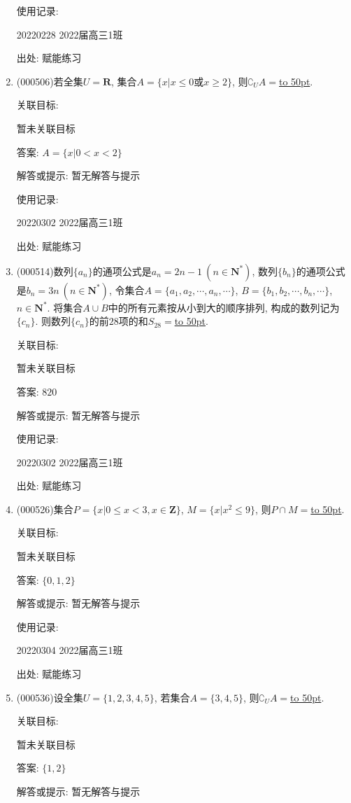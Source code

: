 \documentclass[10pt,a4paper]{article}
\newcommand{\blank}[1]{\underline{\hbox to #1pt{}}}
\begin{document}
\begin{enumerate}[1.]
使用记录:

20220228	2022届高三1班	


出处: 赋能练习
\item { (000506)}若全集$U=\mathbf{R}$, 集合$A=\{x|x\le 0\text{或} x\ge 2\}$, 则$\complement_U A=$\blank{50}.


关联目标:

暂未关联目标

答案: $A=\{x|0<x<2\}$

解答或提示: 暂无解答与提示

使用记录:

20220302	2022届高三1班	


出处: 赋能练习
\item { (000514)}数列$\{a_n\}$的通项公式是$a_n=2n-1\ (n\in \mathbf{N}^*)$, 数列$\{b_n\}$的通项公式是$b_n=3n \ (n\in \mathbf{N}^*)$, 令集合$A=\{a_1,a_2,\cdots,a_n,\cdots\}$, $B=\{b_1,b_2,\cdots,b_n,\cdots\}$, $n\in \mathbf{N}^*$. 将集合$A\cup B$中的所有元素按从小到大的顺序排列, 构成的数列记为$\{c_n\}$. 则数列$\{c_n\}$的前$28$项的和$S_{28}=$\blank{50}.


关联目标:

暂未关联目标

答案: $820$

解答或提示: 暂无解答与提示

使用记录:

20220302	2022届高三1班	


出处: 赋能练习
\item { (000526)}集合$P=\{x|0 \le x<3, x\in \mathbf{Z}\}$, $M=\{x|x^2 \le 9\}$, 则$P\cap M=$\blank{50}.


关联目标:

暂未关联目标

答案: $\{ 0,1,2 \}$

解答或提示: 暂无解答与提示

使用记录:

20220304	2022届高三1班	


出处: 赋能练习
\item { (000536)}设全集$U=\{ 1,2,3,4,5\}$, 若集合$A=\{3,4,5\}$, 则$\complement_U A=$\blank{50}.


关联目标:

暂未关联目标

答案: $\{1,2\}$

解答或提示: 暂无解答与提示


\end{enumerate}
\end{document}

